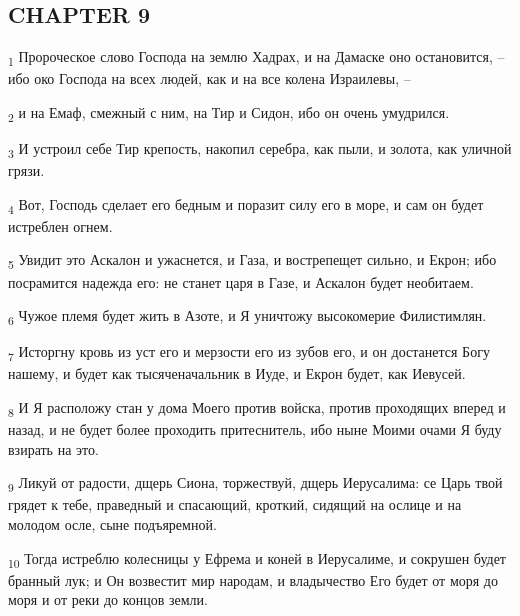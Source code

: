 \subsection{CHAPTER 9}
\begin{tcolorbox}
\textsubscript{1} Пророческое слово Господа на землю Хадрах, и на Дамаске оно остановится, --ибо око Господа на всех людей, как и на все колена Израилевы, --
\end{tcolorbox}
\begin{tcolorbox}
\textsubscript{2} и на Емаф, смежный с ним, на Тир и Сидон, ибо он очень умудрился.
\end{tcolorbox}
\begin{tcolorbox}
\textsubscript{3} И устроил себе Тир крепость, накопил серебра, как пыли, и золота, как уличной грязи.
\end{tcolorbox}
\begin{tcolorbox}
\textsubscript{4} Вот, Господь сделает его бедным и поразит силу его в море, и сам он будет истреблен огнем.
\end{tcolorbox}
\begin{tcolorbox}
\textsubscript{5} Увидит это Аскалон и ужаснется, и Газа, и вострепещет сильно, и Екрон; ибо посрамится надежда его: не станет царя в Газе, и Аскалон будет необитаем.
\end{tcolorbox}
\begin{tcolorbox}
\textsubscript{6} Чужое племя будет жить в Азоте, и Я уничтожу высокомерие Филистимлян.
\end{tcolorbox}
\begin{tcolorbox}
\textsubscript{7} Исторгну кровь из уст его и мерзости его из зубов его, и он достанется Богу нашему, и будет как тысяченачальник в Иуде, и Екрон будет, как Иевусей.
\end{tcolorbox}
\begin{tcolorbox}
\textsubscript{8} И Я расположу стан у дома Моего против войска, против проходящих вперед и назад, и не будет более проходить притеснитель, ибо ныне Моими очами Я буду взирать на это.
\end{tcolorbox}
\begin{tcolorbox}
\textsubscript{9} Ликуй от радости, дщерь Сиона, торжествуй, дщерь Иерусалима: се Царь твой грядет к тебе, праведный и спасающий, кроткий, сидящий на ослице и на молодом осле, сыне подъяремной.
\end{tcolorbox}
\begin{tcolorbox}
\textsubscript{10} Тогда истреблю колесницы у Ефрема и коней в Иерусалиме, и сокрушен будет бранный лук; и Он возвестит мир народам, и владычество Его будет от моря до моря и от реки до концов земли.
\end{tcolorbox}
